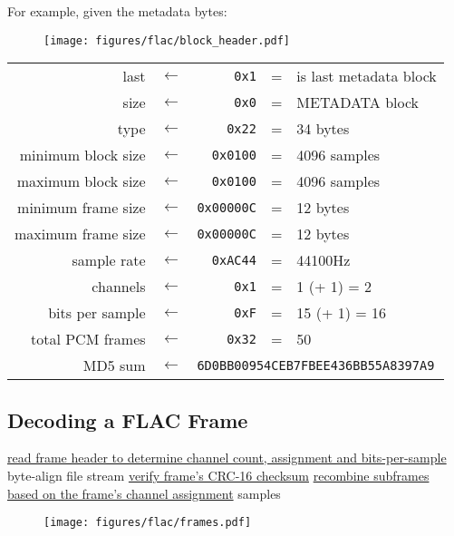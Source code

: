 \clearpage

For example, given the metadata bytes:
\begin{figure}[h]
\texttt{[image: figures/flac/block\_header.pdf]}
\end{figure}
\par
\noindent
\begin{tabular}{rcrcl}
\textsf{last} & $\leftarrow$ & \texttt{0x1} & = & is last metadata block \\
\textsf{size} & $\leftarrow$ & \texttt{0x0} & = & METADATA block \\
\textsf{type} & $\leftarrow$ & \texttt{0x22} & = & 34 bytes \\
\textsf{minimum block size} & $\leftarrow$ & \texttt{0x0100} & = & 4096 samples \\
\textsf{maximum block size} & $\leftarrow$ & \texttt{0x0100} & = & 4096 samples \\
\textsf{minimum frame size} & $\leftarrow$ & \texttt{0x00000C} & = & 12 bytes \\
\textsf{maximum frame size} & $\leftarrow$ & \texttt{0x00000C} & = & 12 bytes \\
\textsf{sample rate} & $\leftarrow$ & \texttt{0xAC44} & = & 44100Hz \\
\textsf{channels} & $\leftarrow$ & \texttt{0x1} & = & 1 (+ 1) = 2 \\
\textsf{bits per sample} & $\leftarrow$ & \texttt{0xF} & = & 15 (+ 1) = 16 \\
\textsf{total PCM frames} & $\leftarrow$ & \texttt{0x32} & = & 50 \\
\textsf{MD5 sum} & $\leftarrow$ & \multicolumn{3}{l}{\texttt{6D0BB00954CEB7FBEE436BB55A8397A9}} \\
\end{tabular}

\clearpage

\subsection{Decoding a FLAC Frame}
\label{flac:decode_frame}
\hyperref[flac:read_frame_header]{read frame header to determine channel count, assignment and bits-per-sample}\;
byte-align file stream\;
\hyperref[flac:verify_crc16]{verify frame's CRC-16 checksum}\;
\hyperref[flac:recombine_subframes]{recombine subframes based on the frame's channel assignment}\;
\Return samples\;
\EALGORITHM
\begin{figure}[h]
\texttt{[image: figures/flac/frames.pdf]}
\end{figure}

